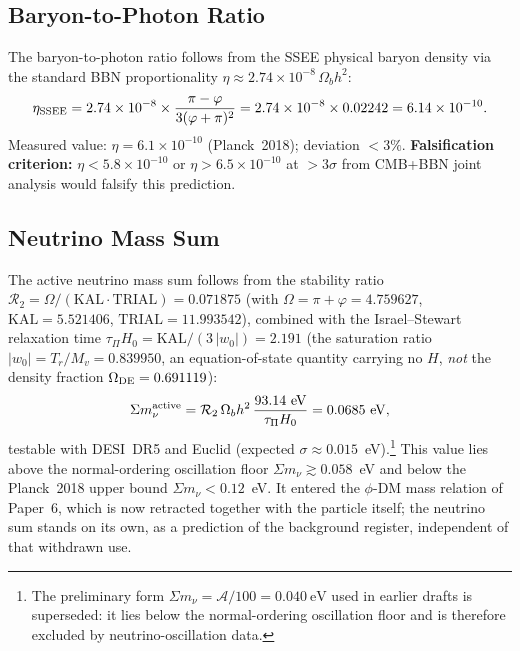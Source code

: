 \documentclass[12pt,a4paper]{article}
\begin{document}
\subsection{Baryon-to-Photon Ratio}

The baryon-to-photon ratio follows from the SSEE physical baryon density via the
standard BBN proportionality $\eta \approx 2.74\times10^{-8}\,\Omega_b h^2$:
\begin{equation}
  \eta_{\rm SSEE} = 2.74\times10^{-8}\times\frac{\pi-\varphi}{3(\varphi+\pi)^2}
    = 2.74\times10^{-8}\times0.02242 = 6.14\times10^{-10}.
\end{equation}
Measured value: $\eta = 6.1\times10^{-10}$ (Planck~2018); deviation $<3\%$.
\textbf{Falsification criterion:} $\eta < 5.8\times10^{-10}$ or $\eta > 6.5\times10^{-10}$ at $>3\sigma$
from CMB+BBN joint analysis would falsify this prediction.

\subsection{Neutrino Mass Sum}

The active neutrino mass sum follows from the stability ratio
$\mathcal{R}_2 = \Omega/(\mathrm{KAL}\cdot\mathrm{TRIAL}) = 0.071875$
(with $\Omega=\pi+\varphi=4.759627$, $\mathrm{KAL}=5.521406$, $\mathrm{TRIAL}=11.993542$),
combined with the Israel--Stewart relaxation time
$\tau_\Pi H_0 = \mathrm{KAL}/(3\,|w_0|) = 2.191$ (the saturation
ratio $|w_0|=T_r/M_v=0.839950$, an equation-of-state quantity carrying no
$H$, \emph{not} the density fraction $\Omega_{\rm DE}=0.691119$):
\begin{equation}
  \Sigma m_\nu^{\rm active}
    = \mathcal{R}_2\,\Omega_b h^2\,\frac{93.14~\mathrm{eV}}{\tau_\Pi H_0}
    = 0.0685~\mathrm{eV},
\end{equation}
testable with DESI~DR5 and Euclid (expected $\sigma\approx 0.015$~eV).\footnote{%
The preliminary form $\Sigma m_\nu=\mathcal{A}/100=0.040~\mathrm{eV}$ used in
earlier drafts is superseded: it lies below the normal-ordering oscillation floor
and is therefore excluded by neutrino-oscillation data.}
This value lies above the normal-ordering oscillation floor
$\Sigma m_\nu\gtrsim0.058$~eV and below the Planck~2018 upper bound
$\Sigma m_\nu<0.12$~eV. It entered the $\phi$-DM mass relation of Paper~6, which is now retracted
together with the particle itself; the neutrino sum stands on its own, as a
prediction of the background register, independent of that withdrawn use.
\end{document}
